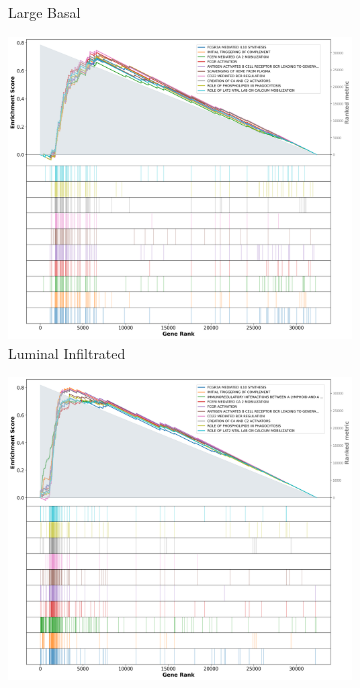 \begin{figure}[!h]
\begin{subfigure}[!t]{0.4\textwidth}
        \caption{Large Basal}
        \label{fig:ap:gsea_largeBasal}
    \end{subfigure} 
    \begin{subfigure}[!t]{0.4\textwidth}
        \centering
        \includegraphics[width=\textwidth,keepaspectratio]{Sections/Network_I/Resources/selective_pruning/gsea/lumInf_10_top_manTerms.png}
        \caption{Luminal Infiltrated}
        \label{fig:ap:gsea_lumInf}
    \end{subfigure}
    \begin{subfigure}[!t]{0.4\textwidth}
        \centering
        \includegraphics[width=\textwidth,keepaspectratio]{Sections/Network_I/Resources/selective_pruning/gsea/mesLike_10_top_manTerms.png}

\end{subfigure}
\end{figure}
